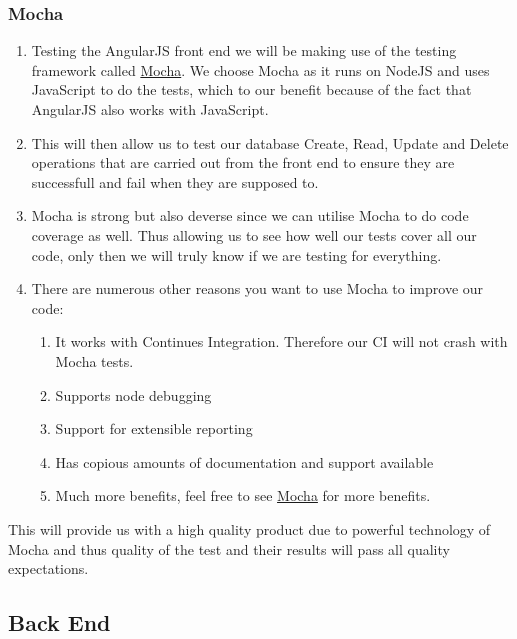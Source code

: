 \documentclass{article}
\begin{document}
		\subsubsection{Mocha}
			\begin{enumerate}
				\item Testing the AngularJS front end we will be making use of the testing framework called \href{http://mochajs.org/}{Mocha}. We choose Mocha as it runs on NodeJS and uses JavaScript to do the tests, which to our benefit because of the fact that AngularJS also works with JavaScript.
				\item This will then allow us to test our database Create, Read, Update and Delete operations that are carried out from the front end to ensure they are successfull and fail when they are supposed to.
				\item Mocha is strong but also deverse since we can utilise Mocha to do code coverage as well. Thus allowing us to see how well our tests cover all our code, only then we will truly know if we are testing for everything.
				\item There are numerous other reasons you want to use Mocha to improve our code:
					\begin{enumerate}
						\item It works with Continues Integration. Therefore our CI will not crash with Mocha tests.
						\item Supports node debugging 
						\item Support for extensible reporting 
						\item Has copious amounts of documentation and support available
						\item Much more benefits, feel free to see \href{http://mochajs.org/}{Mocha} for more benefits.
					\end{enumerate} 
			\end{enumerate}
			\noindent
			This will provide us with a high quality product due to powerful technology of Mocha and thus quality of the test and their results will pass all quality expectations.
	\subsection{Back End}
\end{document}
